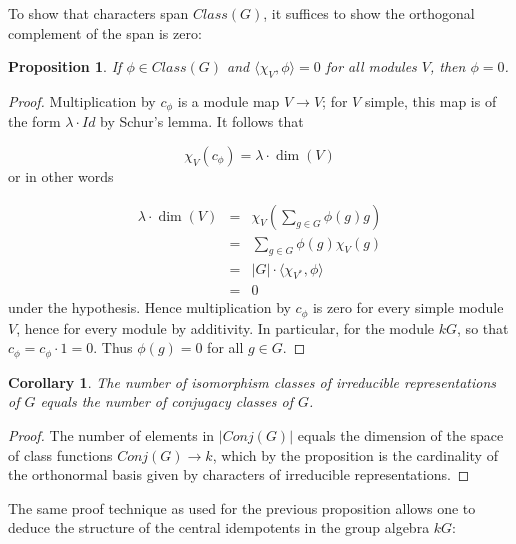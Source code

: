 \documentclass[12pt,titlepage]{article}
\newcommand{\itexarray}[1]{\begin{matrix}#1\end{matrix}}
\theoremstyle{plain}
\newtheorem{prop}{Proposition}
\newtheorem{cor}{Corollary}
\theoremstyle{definition}
\theoremstyle{remark}
\begin{document}
To show that characters span $Class(G)$, it suffices to show the orthogonal complement of the span is zero:

\begin{prop}
\label{}\hypertarget{}{}
If $\phi \in Class(G)$ and $\langle \chi_V, \phi \rangle = 0$ for all modules $V$, then $\phi = 0$.

\end{prop}
\begin{proof}
Multiplication by $c_\phi$ is a module map $V \to V$; for $V$ simple, this map is of the form $\lambda \cdot Id$ by Schur's lemma. It follows that

\begin{displaymath}
\chi_V(c_\phi) = \lambda \cdot \dim(V)
\end{displaymath}
or in other words

\begin{displaymath}
\itexarray{
\lambda \cdot \dim(V) & = & \chi_V(\sum_{g \in G} \phi(g) g) \\ 
 & = & \sum_{g \in G} \phi(g) \chi_V(g) \\ 
 & = & {|G|} \cdot \langle \chi_{V^\ast}, \phi \rangle \\ 
 & = & 0
}
\end{displaymath}
under the hypothesis. Hence multiplication by $c_\phi$ is zero for every simple module $V$, hence for every module by additivity. In particular, for the module $k G$, so that $c_\phi = c_\phi \cdot 1 = 0$. Thus $\phi(g) = 0$ for all $g \in G$.

\end{proof}
\begin{cor}
\label{}\hypertarget{}{}
The number of isomorphism classes of irreducible representations of $G$ equals the number of conjugacy classes of $G$.

\end{cor}
\begin{proof}
The number of elements in ${|Conj(G)|}$ equals the dimension of the space of class functions $Conj(G) \to k$, which by the proposition is the cardinality of the orthonormal basis given by characters of irreducible representations.

\end{proof}
The same proof technique as used for the previous proposition allows one to deduce the structure of the central idempotents in the group algebra $k G$:
\end{document}
